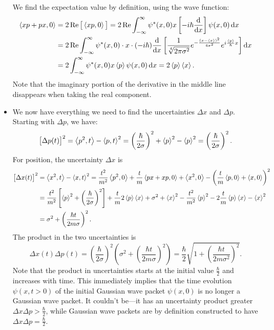 \documentclass[11pt, a4paper]{article}
\newcommand{\diff}{\mathop{}\!\mathrm{d}} %
\begin{document}
\begin{itemize}
	We find the expectation value by definition, using the wave function:
	\begin{align*}
		\ev{xp + px, 0} &= 2\Re \big[\ev{xp, 0}\big] = 2\Re \int_{-\infty}^{\infty}\psi^{*}(x, 0)x\left[-i\hbar \dv{x}\right]\psi(x, 0) \diff x\\
		&= 2 \Re \int_{-\infty}^{\infty} \psi^{*}(x, 0) \cdot x \cdot (-i\hbar)\dv{x}\left[\frac{1}{\sqrt[4]{2\pi \sigma^{2}}}e^{-\frac{(x - \ev{x})^{2}}{4\sigma^{2}}}e^{i\frac{\ev{p}}{\hbar}x}\right]  \diff x\\
		&=2 \int_{-\infty}^{\infty} \psi^{*}(x, 0)x \ev{p} \psi(x, 0) \diff x = 2 \ev{p}\ev{x}.
	\end{align*}
	Note that the imaginary portion of the derivative in the middle line disappears when taking the real component.
	
	\item We now have everything we need to find the uncertainties $ \Delta x $ and $ \Delta p $. Starting with $ \Delta p $, we have:
	\begin{equation*}
		\big[\Delta p(t)\big]^{2} = \ev{p^{2}, t} - \ev{p, t}^{2} =  \left(\frac{\hbar}{2\sigma}\right)^{2} + \ev{p}^{2} - \ev{p}^{2} = \left(\frac{\hbar}{2\sigma}\right)^{2}.
	\end{equation*}
	For position, the uncertainty $ \Delta x $ is
	\begin{align*}
		\big[\Delta x(t)\big]^{2} &= \ev{x^{2}, t} - \ev{x, t}^{2} = \frac{t^{2}}{m^{2}}\ev{p^{2}, 0} + \frac{t}{m} \ev{px + xp, 0} + \ev{x^{2}, 0} - \left( \frac{t}{m} \ev{p, 0} + \ev{x, 0} \right)^{2}\\
		&=\frac{t^{2}}{m^{2}}\left[\ev{p}^{2} + \left(\frac{\hbar}{2\sigma}\right)^{2}\right] + \frac{t}{m}2\ev{p}\ev{x} + \sigma^{2} + \ev{x}^{2} - \frac{t^{2}}{m^{2}}\ev{p}^{2} - 2\frac{t}{m}\ev{p}\ev{x} - \ev{x}^{2}\\
		&= \sigma^{2} + \left(\frac{\hbar t}{2m\sigma}\right)^{2}.
	\end{align*}
	The product in the two uncertainties is 
	\begin{equation*}
		\Delta x(t) \Delta p(t) = \left(\frac{\hbar}{2\sigma}\right)^{2}\left(\sigma^{2} + \left(\frac{\hbar t}{2m\sigma}\right)^{2}\right) = \frac{\hbar}{2}\sqrt{1 + \left(\frac{\hbar t}{2m\sigma^{2}}\right)^{2}}.
	\end{equation*}
	Note that the product in uncertainties starts at the initial value $ \frac{\hbar}{2} $ and increases with time. This immediately implies that the time evolution $ \psi(x, t > 0) $ of the initial Gaussian wave packet $ \psi(x, 0) $ is no longer a Gaussian wave packet. It couldn't be---it has an uncertainty product greater $ \Delta x \Delta p > \frac{\hbar}{2} $, while Gaussian wave packets are by definition constructed to have $ \Delta x \Delta p = \frac{\hbar}{2} $. 
\end{itemize}
\end{document}
